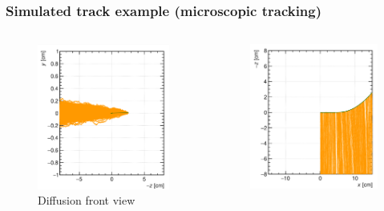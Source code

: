 \documentclass{beamer}
\begin{document}
	\begin{frame}
		\frametitle{Simulated track example (microscopic tracking)}		
		\begin{columns}
			\begin{figure}
				\centering
				\includegraphics[width = 0.95 \linewidth]{../images/track1.png}
				\caption{Diffusion front view}
			\end{figure}
			\begin{figure}
				\centering
				\includegraphics[width = 0.95 \linewidth]{../images/track2.png}

\end{figure}
\end{columns}
\end{frame}
\end{document}
